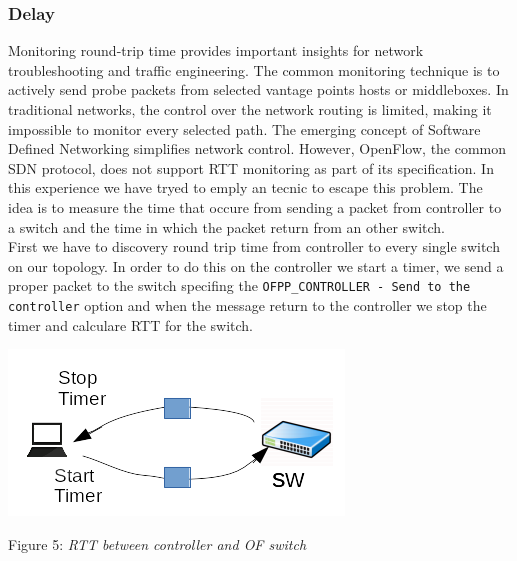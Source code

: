 \documentclass[article,10pt]{IEEEtran}
\begin{document}
\subsubsection{Delay}
Monitoring round-trip time provides important insights for network troubleshooting and traffic engineering.
The  common  monitoring  technique  is  to  actively  send  probe packets  from  selected  vantage  points  hosts  or  middleboxes.
In traditional  networks, the control over the network routing is
limited,  making  it  impossible  to  monitor  every  selected  path. The  emerging  concept  of  Software  Defined  Networking  simplifies
network  control.  However,  OpenFlow,  the  common  SDN protocol,   does   not   support   RTT   monitoring   as   part   of   its
specification. In this experience we have tryed to emply an tecnic to escape this problem\cite{rtt}.
\newline The idea is to measure the time that occure from sending a packet from controller to a switch and the time in which the packet return from
an other switch.
\\
\newline First we have to discovery round trip time from controller to every single switch on our topology.
In order to do this on the controller we start a timer, we send a proper packet to the switch specifing the \texttt{OFPP_CONTROLLER - Send to the controller}
option and when the message return to the controller we stop the timer and calculare RTT for the switch.
\begin{center}
 \centering
 \includegraphics[scale=0.70]{images/rtt2.png}
 
 \label{fig:topo}
\end{center}

\begin{center}
 {Figure 5: \emph{RTT between controller and OF switch}}
\end{center}
\end{document}
